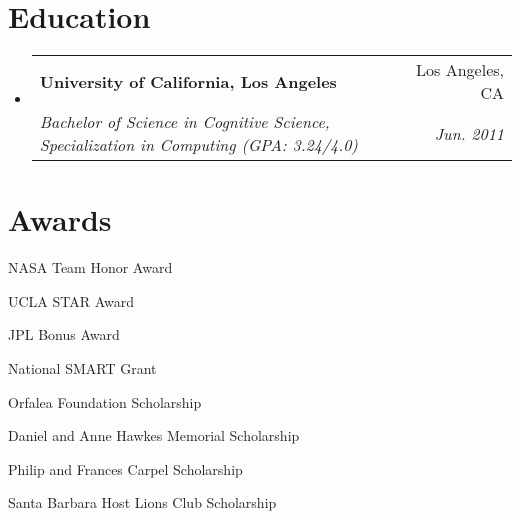 \documentclass[letterpaper,11pt]{article}
\makeatletter
\newcommand{\resumeSubheading}[4]{
  \vspace{-2pt}\item
    \begin{tabular*}{0.97\textwidth}[t]{l@{\extracolsep{\fill}}r}
      \textbf{#1} & #2 \\
      \textit{\small#3} & \textit{\small #4} \\
    \end{tabular*}\vspace{-7pt}
}
\newcommand{\resumeSubHeadingListStart}{\begin{itemize}[leftmargin=0.15in, label={}]}
\newcommand{\resumeSubHeadingListEnd}{\end{itemize}}
\makeatother
\begin{document}
  \section{Education}
    \resumeSubHeadingListStart
      \resumeSubheading
        {University of California, Los Angeles}{Los Angeles, CA}
        {Bachelor of Science in Cognitive Science, Specialization in Computing (GPA: 3.24/4.0)}{Jun. 2011}
    \resumeSubHeadingListEnd

  \section{Awards}
    \vspace*{-1.4\multicolsep}
    \begin{multicols}{2}
      \begin{itemize}
        \setlength{\parskip}{0pt}
        \setlength{\itemsep}{0pt plus 1pt}
        \small{
          \item{NASA Team Honor Award}
          \item{UCLA STAR Award}
          \item{JPL Bonus Award}
          \item{National SMART Grant}
          \item{Orfalea Foundation Scholarship}
          \item{Daniel and Anne Hawkes Memorial Scholarship}
          \item{Philip and Frances Carpel Scholarship}
          \item{Santa Barbara Host Lions Club Scholarship}
        }
      \end{itemize}
    \end{multicols}
\end{document}
